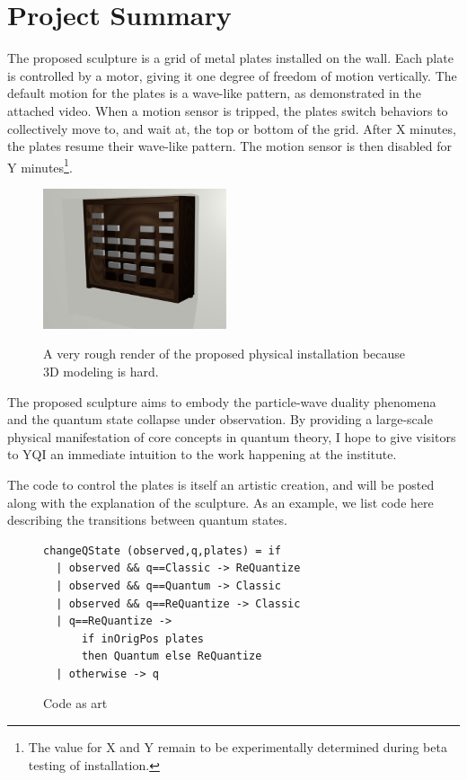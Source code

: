 \section{Project Summary}

The proposed sculpture is a grid of metal plates installed on the wall.
Each plate is controlled by a motor, giving it one degree of freedom of motion vertically.
The default motion for the plates is a wave-like pattern, as demonstrated in the attached video.
When a motion sensor is tripped, the plates switch behaviors to collectively move to, and wait at, the top or bottom of the grid.
After X minutes, the plates resume their wave-like pattern. 
The motion sensor is then disabled for Y minutes\footnote{The value for X and Y remain to be experimentally determined during beta testing of installation.}.

\begin{figure}[h!]
\includegraphics[width=0.48\textwidth]{../Test.png}
\label{fig:render}
\caption{A very rough render of the proposed physical installation because 3D modeling is hard.}
\end{figure}

The proposed sculpture aims to embody the particle-wave duality phenomena and the quantum state collapse under observation.
By providing a large-scale physical manifestation of core concepts in quantum theory, I hope to give visitors to YQI an immediate intuition to the work happening at the institute.



The code to control the plates is itself an artistic creation, and will be posted along with the explanation of the sculpture.
As an example, we list code here describing the transitions between quantum states.

\begin{figure}
\begin{lstlisting}
changeQState (observed,q,plates) = if
  | observed && q==Classic -> ReQuantize
  | observed && q==Quantum -> Classic
  | observed && q==ReQuantize -> Classic
  | q==ReQuantize -> 
      if inOrigPos plates 
      then Quantum else ReQuantize
  | otherwise -> q

\end{lstlisting}
\label{fig:code}
\caption{Code as art}
\end{figure}


